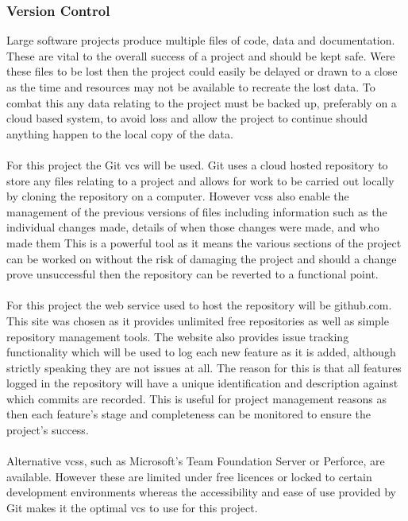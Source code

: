 		\subsubsection{Version Control}\label{sec:methodology_version_control}
			Large software projects produce multiple files of code, data and documentation. These are vital to the overall success of a project and should be kept safe. Were these files to be lost then the project could easily be delayed or drawn to a close as the time and resources may not be available to recreate the lost data. To combat this any data relating to the project must be backed up, preferably on a cloud based system, to avoid loss and allow the project to continue should anything happen to the local copy of the data.
			\\\\
			For this project the Git \gls{vcs} will be used. Git uses a cloud hosted repository to store any files relating to a project and allows for work to be carried out locally by cloning the repository on a computer. However \glspl{vcs} also enable the management of the previous versions of files including information such as the individual changes made, details of when those changes were made, and who made them This is a powerful tool as it means the various sections of the project can be worked on without the risk of damaging the project and should a change prove unsuccessful then the repository can be reverted to a functional point.
			\\\\
			For this project the web service used to host the repository will be github.com. This site was chosen as it provides unlimited free repositories as well as simple repository management tools. The website also provides issue tracking functionality which will be used to log each new feature as it is added, although strictly speaking they are not issues at all. The reason for this is that all features logged in the repository will have a unique identification and description against which commits are recorded. This is useful for project management reasons as then each feature’s stage and completeness can be monitored to ensure the project’s success.
			\\\\
			Alternative \glspl{vcs}, such as Microsoft’s Team Foundation Server or Perforce, are available. However these are limited under free licences or locked to certain development environments whereas the accessibility and ease of use provided by Git makes it the optimal \gls{vcs} to use for this project.
